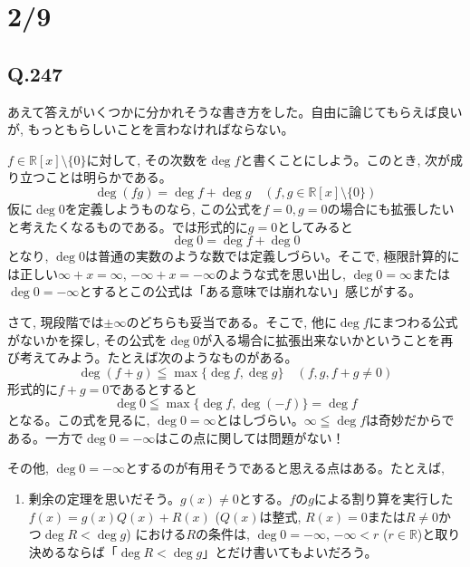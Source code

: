 \documentclass[twocolumn]{jbook}
\theoremstyle{definition}
\newcommand{\ben}{\begin{enumerate}}
\newcommand{\een}{\end{enumerate}}
\newcommand{\mb}{\mathbb}
\renewcommand{\leq}{\leqq}
\begin{document}
\clearpage
\section{2/9}
\subsection{Q.247}
あえて答えがいくつかに分かれそうな書き方をした。自由に論じてもらえば良いが, もっともらしいことを言わなければならない。\par
$f\in \mb{R}[x]\setminus{\{ 0 \}}$に対して, その次数を$\deg{f}$と書くことにしよう。このとき, 次が成り立つことは明らかである。
\[\deg{(fg)} = \deg{f} + \deg{g}\quad (f,g\in \mb{R}[x]\setminus{\{ 0 \}})\]
仮に$\deg{0}$を定義しようものなら, この公式を$f=0, g=0$の場合にも拡張したいと考えたくなるものである。では形式的に$g=0$としてみると
\[\deg{0} = \deg{f} + \deg{0}\]
となり, $\deg{0}$は普通の実数のような数では定義しづらい。そこで, 極限計算的には正しい$\infty + x = \infty$, $-\infty + x = -\infty$のような式を思い出し, $\deg{0} = \infty$または$\deg{0} = -\infty$とするとこの公式は「ある意味では崩れない」感じがする。\par 
さて, 現段階では$\pm \infty$のどちらも妥当である。そこで, 他に$\deg{f}$にまつわる公式がないかを探し, その公式を$\deg{0}$が入る場合に拡張出来ないかということを再び考えてみよう。たとえば次のようなものがある。
\[\deg{(f+g)} \leq  \max{\{ \deg{f}, \deg{g}\} } \quad (f,g,f+g\neq 0)\]
形式的に$f+g = 0$であるとすると
\[\deg{0} \leq \max{\{ \deg{f}, \deg{(-f)}\} } = \deg{f}\]
となる。この式を見るに, $\deg{0} = \infty$とはしづらい。$\infty \leq \deg{f}$は奇妙だからである。一方で$\deg{0} = -\infty$はこの点に関しては問題がない！\par 
その他, $\deg{0} = -\infty$とするのが有用そうであると思える点はある。たとえば, 
\ben 
\item 剰余の定理を思いだそう。$g(x)\neq 0$とする。$f$の$g$による割り算を実行した$f(x) = g(x)Q(x) + R(x)$ ($Q(x)$は整式, $R(x) = 0$または$R\neq 0$かつ$\deg{R} < \deg{g}$) における$R$の条件は, $\deg{0} = -\infty$, $-\infty < r$ ($r\in \mb{R}$)と取り決めるならば「$\deg{R} < \deg{g}$」とだけ書いてもよいだろう。 
\een
\end{document}
